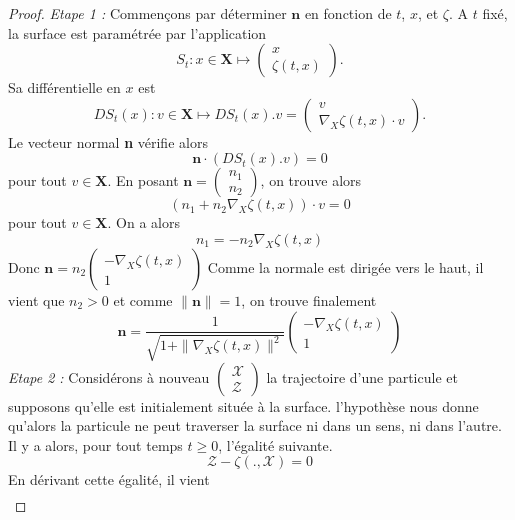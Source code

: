 \documentclass[12pt,a4paper]{article}
\numberwithin{equation}{section}
\begin{document}
\begin{proof}
\textit{Etape 1 : }Commençons par déterminer $\textbf{n}$ en fonction de $t$, $x$, et $\zeta$. A $t$ fixé, la surface est paramétrée par l'application $$S_t: x\in \textbf{X} \mapsto \left(\begin{array}{l}
         x\\
         \zeta(t,x)
    \end{array}\right).$$
Sa différentielle en $x$ est 
$$DS_t(x) : v \in \textbf{X} \mapsto DS_t(x).v = \left(\begin{array}{l}
         v\\
         \nabla_X\zeta(t,x) \cdot v
    \end{array}\right).$$
Le vecteur normal \textbf{n} vérifie alors $$\textbf{n}\cdot (DS_t(x).v) = 0$$
pour tout $v \in \textbf{X}$. En posant $\textbf{n} = \left(\begin{array}{l}
         n_1\\
         n_2
    \end{array}\right)$, on trouve alors
    $$ \left(n_1 + n_2\nabla_X\zeta(t,x)\right)\cdot v = 0$$
pour tout $v\in\textbf{X}$. On a alors
$$ n_1 =  - n_2\nabla_X\zeta(t,x)$$
Donc $\textbf{n} = n_2\left(\begin{array}{l}
         - \nabla_X\zeta(t,x)\\
         1
    \end{array}\right)$
Comme la normale est dirigée vers le haut, il vient que $n_2>0$ et comme $\|\textbf{n}\| = 1$, on trouve finalement \begin{equation} \label{normal_surface_vector}
\textbf{n} = \frac{1}{\sqrt{1+\|\nabla_X\zeta(t,x)\|^2}}\left(\begin{array}{l}
         - \nabla_X\zeta(t,x)\\
         1
    \end{array}\right)\end{equation}
\textit{Etape 2 : }Considérons à nouveau $\left(\begin{array}{l}
         \mathcal{X}\\
         \mathcal{Z}
\end{array}\right)$ 
la trajectoire d'une particule et supposons qu'elle est initialement située à la surface. l'hypothèse nous donne qu'alors la particule ne peut traverser la surface ni dans un sens, ni dans l'autre. Il y a alors, pour tout temps $t \geq 0$, l'égalité suivante.
$$\mathcal{Z} - \zeta( . ,\mathcal{X}) = 0 $$
En dérivant cette égalité, il vient
\begin{align*} 

\end{align*}
\end{proof}
\end{document}
